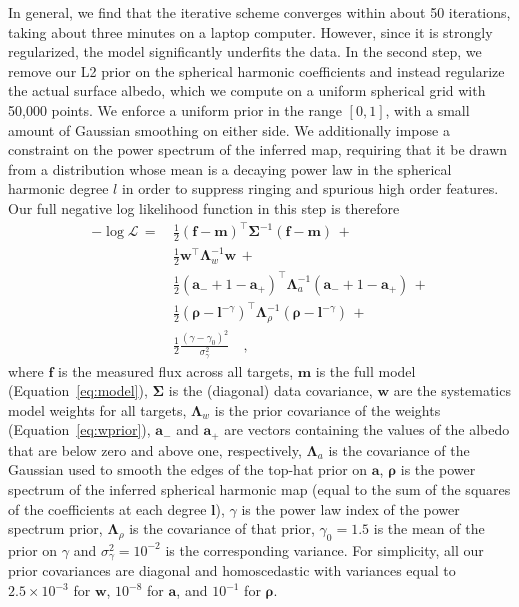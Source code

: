 \documentclass[modern]{aastex62}
\begin{document}
In general, we find that the iterative scheme converges within about 50 
iterations, taking about three minutes on a laptop computer. However, since it 
is strongly regularized, the model significantly
underfits the data. In the second step, we remove our L2 prior on the spherical
harmonic coefficients and instead regularize the actual surface albedo, which
we compute on a uniform spherical grid with 50,000 points. We enforce a 
uniform prior in the range $[0, 1]$, with a small amount of Gaussian smoothing on either 
side. We additionally impose a constraint on the power spectrum of the
inferred map, requiring that it be drawn from a distribution whose mean
is a decaying power law in the spherical harmonic degree $l$ in order
to suppress ringing and spurious high order features.
Our full negative log likelihood function in this step is therefore
%
\begin{align}
    \label{eq:nll}
    -\log\mathcal{L} \, = \, 
        &\frac{1}{2}(\mathbf{f} - \mathbf{m})^\top \boldsymbol{\Sigma}^{-1} (\mathbf{f} - \mathbf{m}) \, + \nonumber \\
        &\frac{1}{2}\mathbf{w}^\top \boldsymbol{\Lambda}_w^{-1} \mathbf{w} \, + \nonumber \\
        &\frac{1}{2}(\mathbf{a_-} + 1 - \mathbf{a_+})^\top \boldsymbol{\Lambda}_a^{-1} (\mathbf{a_-} + 1 - \mathbf{a_+}) \, + \nonumber \\
        &\frac{1}{2}(\boldsymbol{\rho} - \boldsymbol{l}^{-\gamma})^\top \boldsymbol{\Lambda}_\rho^{-1} (\boldsymbol{\rho} - \boldsymbol{l}^{-\gamma}) \, + \nonumber \\
        &\frac{1}{2} \frac{(\gamma - \gamma_0)^2}{\sigma_\gamma^2}
        \quad,
\end{align}
%
where $\mathbf{f}$ is the measured flux across all targets,
$\mathbf{m}$ is the full model (Equation~\ref{eq:model}),
$\boldsymbol{\Sigma}$ is the (diagonal) data covariance, 
$\mathbf{w}$ are the systematics model weights for all targets,
$\boldsymbol{\Lambda}_w$ is the prior covariance of the weights
(Equation~\ref{eq:wprior}), $\mathbf{a_-}$ and $\mathbf{a_+}$ are
vectors containing the values of the albedo that are below zero and above one, 
respectively, $\boldsymbol{\Lambda}_a$ is the covariance of the Gaussian
used to smooth the edges of the top-hat prior on $\mathbf{a}$,
$\boldsymbol{\rho}$ is the power spectrum of the inferred spherical harmonic map
(equal to the sum of the squares of the coefficients at each degree $\boldsymbol{l}$),
$\gamma$ is the power law index of the power spectrum prior, $\boldsymbol{\Lambda}_\rho$ is the
covariance of that prior, $\gamma_0 = 1.5$ is the mean of the prior on $\gamma$
and $\sigma_\gamma^2 = 10^{-2}$ is the corresponding variance.
%
For simplicity, all our prior covariances are diagonal and
homoscedastic with variances equal to $2.5\times 10^{-3}$ for $\mathbf{w}$,
$10^{-8}$ for $\mathbf{a}$, and $10^{-1}$ for $\boldsymbol{\rho}$.
\end{document}
